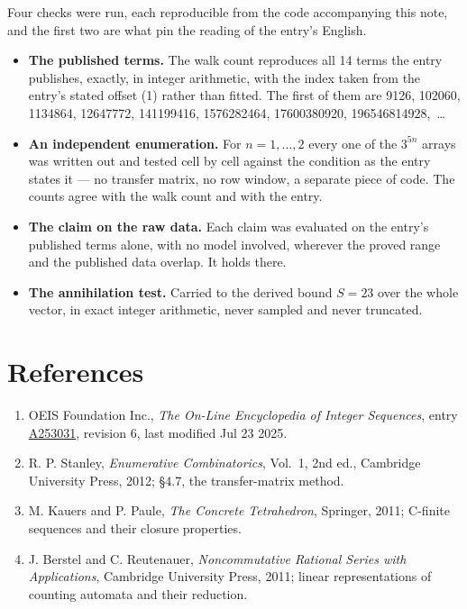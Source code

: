 \documentclass[11pt]{article}
\theoremstyle{definition}
\begin{document}
Four checks were run, each reproducible from the code accompanying this note, and the first two are what pin the reading of the entry's English.

\begin{itemize}

\item {\bfseries The published terms.} The walk count reproduces all 14 terms the entry publishes, exactly, in integer arithmetic, with the index taken from the entry's stated offset (1) rather than fitted. The first of them are 9126, 102060, 1134864, 12647772, 141199416, 1576282464, 17600380920, 196546814928,~\dots

\item {\bfseries An independent enumeration.} For $n = 1,\dots,2$ every one of the $3^{5n}$ arrays was written out and tested cell by cell against the condition as the entry states it --- no transfer matrix, no row window, a separate piece of code. The counts agree with the walk count and with the entry.

\item {\bfseries The claim on the raw data.} Each claim was evaluated on the entry's published terms alone, with no model involved, wherever the proved range and the published data overlap. It holds there.

\item {\bfseries The annihilation test.} Carried to the derived bound $S = 23$ over the whole vector, in exact integer arithmetic, never sampled and never truncated.

\end{itemize}

\section{References}

\begin{enumerate}

\item OEIS Foundation Inc., \emph{The On-Line Encyclopedia of Integer Sequences}, entry \href{https://oeis.org/A253031}{A253031}, revision 6, last modified Jul 23 2025.

\item R. P. Stanley, \emph{Enumerative Combinatorics}, Vol.~1, 2nd ed., Cambridge University Press, 2012; \S4.7, the transfer-matrix method.

\item M. Kauers and P. Paule, \emph{The Concrete Tetrahedron}, Springer, 2011; C-finite sequences and their closure properties.

\item J. Berstel and C. Reutenauer, \emph{Noncommutative Rational Series with Applications}, Cambridge University Press, 2011; linear representations of counting automata and their reduction.

\end{enumerate}
\end{document}
